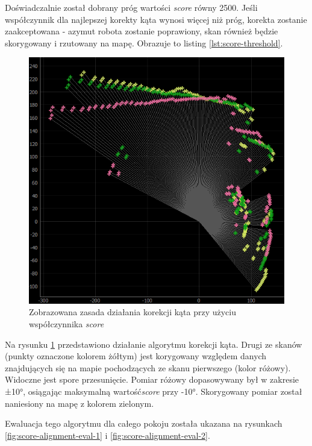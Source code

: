 Doświadczalnie został dobrany próg wartości \emph{score} równy 2500. Jeśli współczynnik dla najlepszej korekty kąta wynosi więcej niż próg, korekta zostanie zaakceptowana - azymut robota zostanie poprawiony, skan również będzie skorygowany i rzutowany na mapę. Obrazuje to listing \ref{lst:score-threshold}.

\begin{figure}[ht]
	\centering
		\includegraphics[width=0.8\linewidth]{rys/ScanBot-13-angular-alignment-1yellow-2pink-3correctedgreen.PNG}
	\caption{Zobrazowana zasada działania korekcji kąta przy użyciu współczynnika \emph{score}}
	\label{fig:score-alignment-rule}
\end{figure}

Na rysunku \ref{fig:score-alignment-rule} przedstawiono działanie algorytmu korekcji kąta. Drugi ze skanów (punkty oznaczone kolorem żółtym) jest korygowany względem danych znajdujących się na mapie pochodzących ze skanu pierwszego (kolor różowy). Widoczne jest spore przesunięcie. Pomiar różowy dopasowywany był w zakresie  ±10°, osiągając maksymalną wartość\emph{score} przy -10°. Skorygowany pomiar został naniesiony na mapę z kolorem zielonym.

Ewaluacja tego algorytmu dla całego pokoju została ukazana na rysunkach \ref{fig:score-alignment-eval-1} i \ref{fig:score-alignment-eval-2}.

